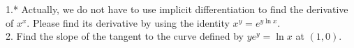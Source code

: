 1.* Actually, we do not have to use implicit differentiation to find the derivative of $x^x$. Please find its derivative by using the identity $x^y=e^{y\ln x}$.\\
2. Find the slope of the tangent to the curve defined by $ye^y=\ln x$ at $(1,0)$.